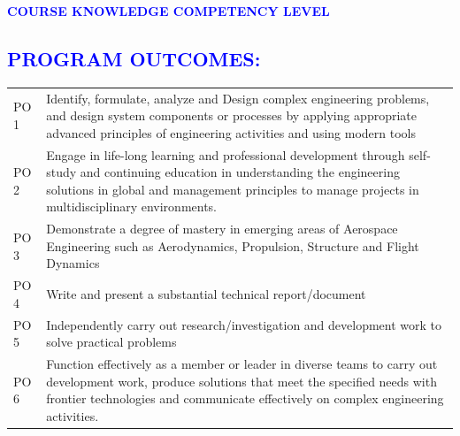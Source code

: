 \documentclass[11pt]{exam}
\begin{document}
\textbf{\textcolor{blue}{\large COURSE KNOWLEDGE COMPETENCY LEVEL}}
\begin{center}	
\end{center}
\newpage
\textcolor{blue}{\section{\large \bfseries  PROGRAM OUTCOMES: }}\vspace{-0.6cm}
\begin{flushleft}
	\begin{longtable}{|>{\centering\arraybackslash}p{1.6cm}  | >{\raggedright\arraybackslash}p{15cm}  | }
		\hline
		\multicolumn{2}{|c|}{\textbf{Program Outcomes}}  \\ \hline
		\endhead
		\hline
		PO 1&	Identify, formulate, analyze and Design complex engineering problems, and design system components or processes by applying appropriate
	advanced principles of engineering activities and using modern tools\\ \hline
	PO 2&	Engage in life-long learning and professional development through self-study
	and continuing education in understanding the engineering solutions in global and management principles to manage projects in multidisciplinary
	environments. \\ \hline
	PO 3&	Demonstrate a degree of mastery in emerging areas of Aerospace Engineering such as Aerodynamics, Propulsion, Structure and Flight
	Dynamics \\ \hline
	PO 4&	Write and present a substantial technical report/document \\ \hline
	PO 5&	Independently carry out research/investigation and development work to
	solve practical problems \\ \hline
	
	PO 6& Function effectively as a member or leader in diverse teams to carry out development work, produce solutions that meet the specified needs with
	frontier technologies and communicate effectively on complex engineering	activities. \\ \hline
	
	\end{longtable}
\end{flushleft}\
\end{document}
